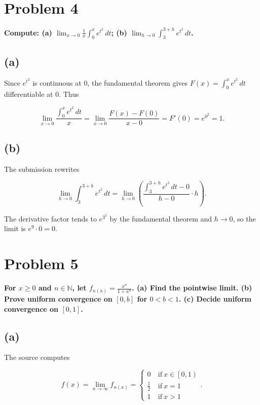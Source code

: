 \section{Problem 4}

\textbf{Compute: (a) \(\lim_{x\rightarrow 0}\frac{1}{x}\int_{0}^{x}e^{t^{2}}\, dt\); (b) \(\lim_{h\rightarrow 0}\int_{3}^{3 + h}e^{t^{2}}\, dt\).}

\subsection{(a)}

Since \(e^{t^{2}}\) is continuous at \(0\), the fundamental theorem gives \(F(x) = \int_{0}^{x}e^{t^{2}}\, dt\) differentiable at \(0\). Thus

\[\lim\limits_{x\rightarrow 0}\frac{\int_{0}^{x}e^{t^{2}}\, dt}{x} = \lim\limits_{x\rightarrow 0}\frac{F(x) - F(0)}{x - 0} = F'(0) = e^{0^{2}} = 1.\]

\subsection{(b)}

The submission rewrites

\[\lim\limits_{h\rightarrow 0}\int_{3}^{3 + h}e^{t^{2}}\, dt = \lim\limits_{h\rightarrow 0}\left( {\frac{\int_{3}^{3 + h}e^{t^{2}}\, dt - 0}{h - 0} \cdot h} \right).\]

The derivative factor tends to \(e^{3^{2}}\) by the fundamental theorem and \(h\rightarrow 0\), so the limit is \(e^{9} \cdot 0 = 0\).

\section{Problem 5}

\textbf{For \(x \geq 0\) and \(n \in \mathbb{N}\), let \(f_{n{(x)}} = \frac{x^{n}}{1 + x^{n}}\). (a) Find the pointwise limit. (b) Prove uniform convergence on \(\left\lbrack {0,b} \right\rbrack\) for \(0 < b < 1\). (c) Decide uniform convergence on \(\left\lbrack {0,1} \right\rbrack\).}

\subsection{(a)}

The source computes

\[f(x) = \lim\limits_{n\rightarrow\infty}f_{n{(x)}} = \left\{ \begin{matrix}
{0\ } & {\text{if}\ x \in \left\lbrack {0,1} \right)} \\
{\frac{1}{2}\ } & {\text{if}\ x = 1} \\
{1\ } & {\text{if}\ x > 1}
\end{matrix} \right..\]

